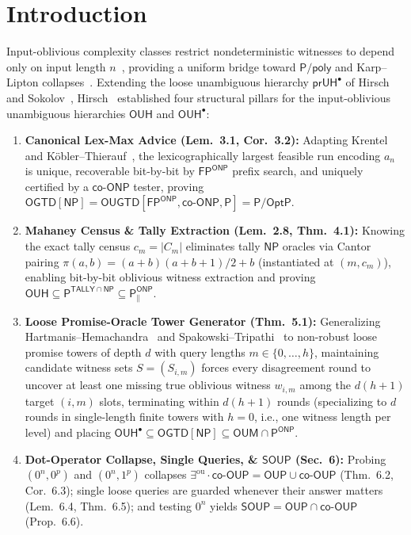 \documentclass[10pt,twocolumn]{article}
\newcommand{\NP}{\mathsf{NP}}
\newcommand{\ONP}{\mathsf{ONP}}
\newcommand{\OUP}{\mathsf{OUP}}
\newcommand{\SOUP}{\mathsf{SOUP}}
\newcommand{\OUH}{\mathsf{OUH}}
\newcommand{\OUM}{\mathsf{OUM}}
\newcommand{\OGTD}{\mathsf{OGTD}}
\newcommand{\OUGTD}{\mathsf{OUGTD}}
\begin{document}
\section{Introduction}\label{sec:intro}
Input-oblivious complexity classes restrict nondeterministic witnesses to depend only on input length $n$~\cite{hirsch2026inputoblivious}, providing a uniform bridge toward $\mathsf{P}/\mathsf{poly}$ and Karp--Lipton collapses~\cite{hirsch2026ultimate}. Extending the loose unambiguous hierarchy $\mathsf{prUH}^\bullet$ of Hirsch and Sokolov~\cite{hirsch2015probabilistic}, Hirsch~\cite{hirsch2026note} established four structural pillars for the input-oblivious unambiguous hierarchies $\OUH$ and $\OUH^\bullet$:
\begin{enumerate}[leftmargin=*,nosep]
  \item \textbf{Canonical Lex-Max Advice (Lem.~3.1, Cor.~3.2):} Adapting Krentel~\cite{krentel1988complexity} and K\"obler--Thierauf~\cite{kobler1994complexity}, the lexicographically largest feasible run encoding $a_n$ is unique, recoverable bit-by-bit by $\mathsf{FP}^{\ONP}$ prefix search, and uniquely certified by a $\mathsf{co}\text{-}\ONP$ tester, proving $\OGTD[\NP] = \OUGTD[\mathsf{FP}^{\ONP}, \mathsf{co}\text{-}\ONP, \mathsf{P}] = \mathsf{P}/\mathsf{OptP}$.
  \item \textbf{Mahaney Census \& Tally Extraction (Lem.~2.8, Thm.~4.1):} Knowing the exact tally census $c_m = |C_m|$ eliminates tally $\NP$ oracles via Cantor pairing $\pi(a, b) = (a+b)(a+b+1)/2 + b$ (instantiated at $(m, c_m)$), enabling bit-by-bit oblivious witness extraction and proving $\OUH \subseteq \mathsf{P}^{\mathsf{TALLY}\cap\NP} \subseteq \mathsf{P}^{\ONP}_\parallel$.
  \item \textbf{Loose Promise-Oracle Tower Generator (Thm.~5.1):} Generalizing Hartmanis--Hemachandra~\cite{hartmanis1990robust} and Spakowski--Tripathi~\cite{spakowski2007power} to non-robust loose promise towers of depth $d$ with query lengths $m \in \{0, \dots, h\}$, maintaining candidate witness sets $S = (S_{i,m})$ forces every disagreement round to uncover at least one missing true oblivious witness $w_{i,m}$ among the $d(h+1)$ target $(i,m)$ slots, terminating within $d(h+1)$ rounds (specializing to $d$ rounds in single-length finite towers with $h=0$, i.e., one witness length per level) and placing $\OUH^\bullet \subseteq \OGTD[\NP] \subseteq \OUM \cap \mathsf{P}^{\ONP}$.
  \item \textbf{Dot-Operator Collapse, Single Queries, \& $\SOUP$ (Sec.~6):} Probing $(0^n, 0^p)$ and $(0^n, 1^p)$ collapses $\exists^{\mathrm{ou}}\!\cdot\!\mathsf{co}\text{-}\OUP = \OUP \cup \mathsf{co}\text{-}\OUP$ (Thm.~6.2, Cor.~6.3); single loose queries are guarded whenever their answer matters~\cite{cai1993promises} (Lem.~6.4, Thm.~6.5); and testing $0^n$ yields $\SOUP = \OUP \cap \mathsf{co}\text{-}\OUP$ (Prop.~6.6).
\end{enumerate}
\end{document}
